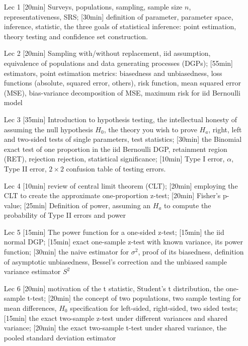 \documentclass[12pt]{article}
\begin{document}
\begin{enumerate}
\item[Lec 1] [20min] Surveys, populations, sampling, sample size $n$, representativeness, SRS; [30min] definition of parameter, parameter space, inference, statistic, the three goals of statistical inference: point estimation, theory testing and confidence set construction. 

\item[Lec 2] [20min] Sampling with/without replacement, iid assumption, equivalence of populations and data generating processes (DGPs); [55min] estimators, point estimation metrics: biasedness and unbiasedness, loss functions (absolute, squared error, others), risk function, mean squared error (MSE), bias-variance decomposition of MSE, maximum risk for iid Bernoulli model

\item[Lec 3] [35min] Introduction to hypothesis testing, the intellectual honesty of assuming the null hypothesis $H_0$, the theory you wish to prove $H_a$, right, left and two-sided tests of single parameters, test statistics; [30min] the Binomial exact test of one proportion in the iid Bernoulli DGP, retainment region (RET), rejection rejection, statistical significance; [10min] Type I error, $\alpha$, Type II error, $2 \times 2$ confusion table of testing errors.

\item[Lec 4] [10min] review of central limit theorem (CLT); [20min] employing the CLT to create the approximate one-proportion z-test; [20min] Fisher's p-value; [25min] Definition of power, assuming an $H_a$ to compute the probability of Type II errors and power

\item[Lec 5] [15min] The power function for a one-sided z-test; [15min] the iid normal DGP; [15min] exact one-sample z-test with known variance, its power function; [30min] the naive estimator for $\sigma^2$, proof of its biasedness, definition of asymptotic unbiasedness, Bessel's correction and the unbiased sample variance estimator $S^2$

\item[Lec 6] [20min] motivation of the t statistic, Student's t distribution, the one-sample t-test; [20min] the concept of two populations, two sample testing for mean differences, $H_0$ specification for left-sided, right-sided, two sided tests; [15min] the exact two-sample z-test under different variances and shared variance; [20min] the exact two-sample t-test under shared variance, the pooled standard deviation estimator


\end{enumerate}
\end{document}
